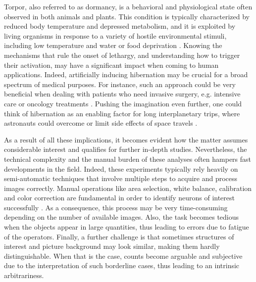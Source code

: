 Torpor, also referred to as dormancy, is a behavioral and physiological state often observed in both animals and plants. 
This condition is typically characterized by reduced body temperature and depressed metabolism, and it is exploited by living organisms in response to a variety of hostile environmental stimuli, including low temperature and water or food deprivation \cite{GANSLOER2019328, WITHERS2019309}.
Knowing the mechanisms that rule the onset of lethargy, and understanding how to trigger their activation,  may have a significant impact when coming to human applications.
Indeed, artificially inducing hibernation may be crucial for a broad spectrum of medical purposes.
For instance, such an approach could be very beneficial when dealing with patients who need invasive surgery, e.g. intensive care or oncology treatments \cite{bouma2012induction, alam2012hypothermia, bellamy1996suspended}.
Pushing the imagination even further, one could think of hibernation as an enabling factor for long interplanetary trips, where astronauts could overcome or limit side effects of space travels \cite{bradford2020aerospace}.

As a result of all these implications, it becomes evident how the matter assumes considerable interest and qualifies for further in-depth studies.
Nevertheless, the technical complexity and the manual burden of these analyses often hampers fast developments in the field.
Indeed, these experiments typically rely heavily on semi-automatic techniques that involve multiple steps to acquire and process images correctly.  
Manual operations like area selection, white balance, calibration and color correction are fundamental in order to identify neurons of interest successfully \cite{luppi1, luppi2, luppi3}. 
As a consequence, this process may be very time-consuming depending on the number of available images. 
Also, the task becomes tedious when the objects appear in large quantities, thus leading to errors due to fatigue of the operators.
Finally, a further challenge is that sometimes structures of interest and picture background may look similar, making them hardly distinguishable. When that is the case, counts become arguable and subjective due to the interpretation of such borderline cases, thus leading to an intrinsic arbitrariness.

